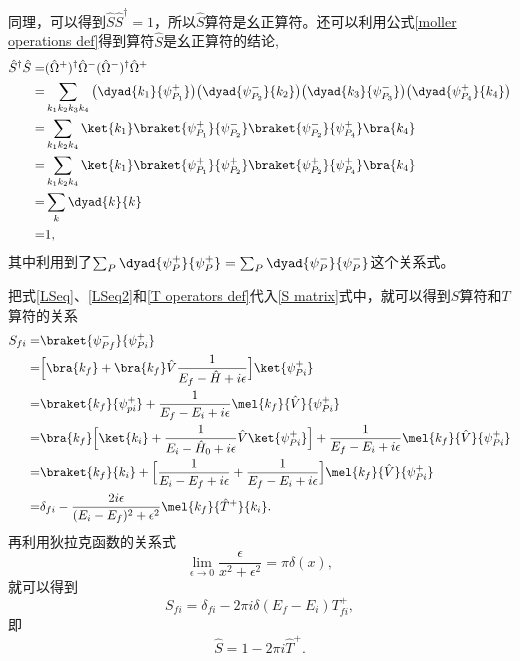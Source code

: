 同理，可以得到$\hat{S}\hat{S}^{\dagger}=1$，所以$\hat{S}$算符是幺正算符。还可以利用公式\eqref{moller operations def}得到算符$\hat{S}$是幺正算符的结论,
\begin{equation}
	\begin{aligned}[b]
	\hat{S}^{\dagger}\hat{S}=&(\hat{\Omega}^{+})^{\dagger}\hat{\Omega}^{-}(\hat{\Omega}^{-})^{\dagger}\hat{\Omega}^{+}\\
	=&\sum_{k_{1}k_{2}k_{3}k_{4}}\big(\dyad{k_{1}}{\psi^{+}_{P_1}}\big)\big(\dyad{\psi^{-}_{P_{2}}}{k_{2}}\big)\big(\dyad{k_{3}}{\psi^{-}_{P_{3}}}\big)\big(\dyad{\psi^{+}_{P_{4}}}{k_{4}}\big)\\
	=&\sum_{k_{1}k_{2}k_{4}}\ket{k_{1}}\braket{\psi^{+}_{P_{1}}}{\psi^{-}_{P_{2}}}\braket{\psi^{-}_{P_{2}}}{\psi^{+}_{P_{4}}}\bra{k_{4}}\\
	=&\sum_{k_{1}k_{2}k_{4}}\ket{k_{1}}\braket{\psi^{+}_{P_{1}}}{\psi^{+}_{P_{2}}}\braket{\psi^{+}_{P_{2}}}{\psi^{+}_{P_{4}}}\bra{k_{4}}\\
	=&\sum_{k}\dyad{k}{k}\\
	=&1,
	\end{aligned}
\end{equation}
其中利用到了$\sum_{P}\dyad{\psi^{+}_{P}}{\psi^{+}_{P}}=\sum_{P}\dyad{\psi^{-}_{P}}{\psi^{-}_{P}}$这个关系式。\par
把式\eqref{LSeq}、\eqref{LSeq2}和\eqref{T operators def}代入\eqref{S matrix}式中，就可以得到$S$算符和$T$算符的关系
\begin{equation}
	\begin{aligned}[b]
	S_{fi}=&\braket{\psi^{-}_{Pf}}{\psi^{+}_{Pi}}\\
	=&\Big[\bra{k_{f}}+\bra{k_{f}}\hat{V}\frac{1}{E_{f}-\hat{H}+i\epsilon}\Big]\ket{\psi^{+}_{Pi}}\\
	=&\braket{k_{f}}{\psi^{+}_{pi}}+\frac{1}{E_{f}-E_{i}+i\epsilon}\mel{k_{f}}{\hat{V}}{\psi^{+}_{Pi}}\\
	=&\bra{k_{f}}\Big[\ket{k_{i}}+\frac{1}{E_{i}-\hat{H}_{0}+i\epsilon}\hat{V}\ket{\psi^{+}_{Pi}}\Big]+\frac{1}{E_{f}-E_{i}+i\epsilon}\mel{k_{f}}{\hat{V}}{\psi^{+}_{Pi}}\\
	=&\braket{k_{f}}{k_{i}}+\Big[\frac{1}{E_{i}-E_{f}+i\epsilon}+\frac{1}{E_{f}-E_{i}+i\epsilon}\Big]\mel{k_{f}}{\hat{V}}{\psi^{+}_{Pi}}\\
	=&\delta_{fi}-\frac{2i\epsilon}{(E_{i}-E_{f})^2+\epsilon^2}\mel{k_{f}}{\hat{T}^{+}}{k_{i}}.
	\end{aligned}
\end{equation}
再利用狄拉克函数的关系式
\begin{equation}
	\lim_{\epsilon\to0}\frac{\epsilon}{x^2+\epsilon^2}=\pi\delta(x),
\end{equation}
就可以得到
\begin{equation}
	S_{fi}=\delta_{fi}-2\pi i\delta(E_{f}-E_{i})T^{+}_{fi},
\end{equation}
即
\begin{equation}
	\hat{S}=1-2\pi i \hat{T}^{+}.
\end{equation}
